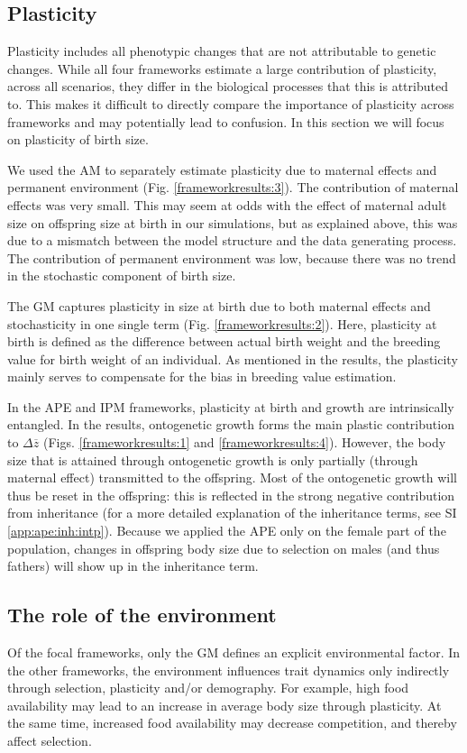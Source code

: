 \subsection*{Plasticity}
Plasticity includes all phenotypic changes that are not attributable to genetic changes. While all four frameworks estimate a large contribution of plasticity, across all scenarios, they differ in the biological processes that this is attributed to. This makes it difficult to directly compare the importance of plasticity across frameworks and may potentially lead to confusion. In this section we will focus on plasticity of birth size.

We used the AM to separately estimate plasticity due to maternal effects and permanent environment (Fig. \ref{frameworkresults:3}). The contribution of maternal effects was very small. This may seem at odds with the effect of maternal adult size on offspring size at birth in our simulations, but as explained above, this was due to a mismatch between the model structure and the data generating process. The contribution of permanent environment was low, because there was no trend in the stochastic component of birth size.

The GM captures plasticity in size at birth due to both maternal effects and stochasticity in one single term (Fig. \ref{frameworkresults:2}). Here, plasticity at birth is defined as the difference between actual birth weight and the breeding value for birth weight of an individual. As mentioned in the results, the plasticity mainly serves to compensate for the bias in breeding value estimation.

In the APE and IPM frameworks, plasticity at birth and growth are intrinsically entangled. In the results, ontogenetic growth forms the main plastic contribution to $\Delta \overline z$ (Figs. \ref{frameworkresults:1} and \ref{frameworkresults:4}). However, the body size that is attained through ontogenetic growth is only partially (through maternal effect) transmitted to the offspring. Most of the ontogenetic growth will thus be reset in the offspring: this is reflected in the strong negative contribution from inheritance (for a more detailed explanation of the inheritance terms, see SI \ref{app:ape:inh:intp}). Because we applied the APE only on the female part of the population, changes in offspring body size due to selection on males (and thus fathers) will show up in the inheritance term.

\subsection*{The role of the environment}
Of the focal frameworks, only the GM defines an explicit environmental factor. In the other frameworks, the environment influences trait dynamics only indirectly through selection, plasticity and/or demography. For example, high food availability may lead to an increase in average body size through plasticity. At the same time, increased food availability may decrease competition, and thereby affect selection.

